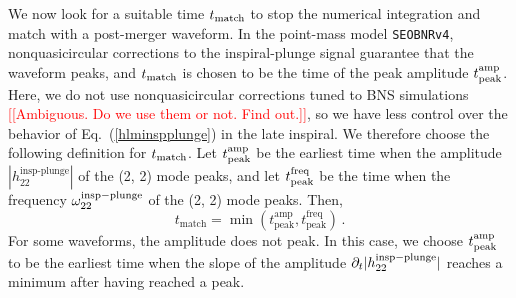 \documentclass[prd,aps,letter,twocolumn,floatfix,notitlepage,nofootinbib]{revtex4-1}
\newcommand{\red}[1]{\textcolor{red}{#1}}
\begin{document}

We now look for a suitable time $t_{\rm match}$ to stop the numerical integration and match with a post-merger waveform. In the point-mass model \texttt{SEOBNRv4}, nonquasicircular corrections to the inspiral-plunge signal guarantee that the waveform peaks, and $t_{\rm match}$ is chosen to be the time of the peak amplitude $t_{\rm peak}^{\rm amp}$. Here, we do not use nonquasicircular corrections tuned to BNS simulations \red{[[Ambiguous. Do we use them or not. Find out.]]}, so we have less control over the behavior of Eq.~(\ref{hlminspplunge}) in the late inspiral. We therefore choose the following definition for $t_{\rm match}$. Let $t_{\rm peak}^{\rm amp}$ be the earliest time when the amplitude $|h_{22}^{\textrm{insp-plunge}}|$ of the (2, 2) mode peaks, and let $t_{\rm peak}^{\rm freq}$ be the time when the frequency $\omega_{22}^{\rm insp-plunge}$ of the (2, 2) mode peaks. Then,
\begin{equation}
t_{\textrm{match}} = \min \left(t_{\textrm{peak}}^{\textrm{amp}},t_{\textrm{peak}}^{\textrm{freq}}\right)\,.\label{tmatch}
\end{equation}
For some waveforms, the amplitude does not peak. In this case, we choose $t_{\rm peak}^{\rm amp}$ to be the earliest time when the slope of the amplitude $\partial_t |h_{22}^{\rm insp-plunge}|$ reaches a minimum after having reached a peak.
\end{document}
